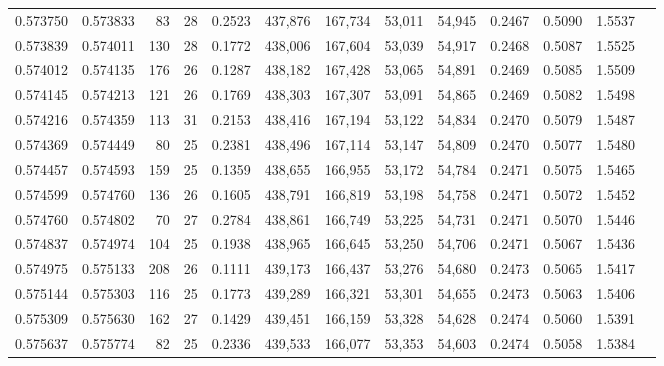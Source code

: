\begin{tabular}{rrrrrrrrrrrrr}
0.573750 & 0.573833 &    83 &  28 &                                     0.2523 & 437,876 & 167,734 &  53,011 &  54,945 & 0.2467 & 0.5090 & 1.5537 \\
0.573839 & 0.574011 &   130 &  28 &                                     0.1772 & 438,006 & 167,604 &  53,039 &  54,917 & 0.2468 & 0.5087 & 1.5525 \\
0.574012 & 0.574135 &   176 &  26 &                                     0.1287 & 438,182 & 167,428 &  53,065 &  54,891 & 0.2469 & 0.5085 & 1.5509 \\
0.574145 & 0.574213 &   121 &  26 &                                     0.1769 & 438,303 & 167,307 &  53,091 &  54,865 & 0.2469 & 0.5082 & 1.5498 \\
0.574216 & 0.574359 &   113 &  31 &                                     0.2153 & 438,416 & 167,194 &  53,122 &  54,834 & 0.2470 & 0.5079 & 1.5487 \\
0.574369 & 0.574449 &    80 &  25 &                                     0.2381 & 438,496 & 167,114 &  53,147 &  54,809 & 0.2470 & 0.5077 & 1.5480 \\
0.574457 & 0.574593 &   159 &  25 &                                     0.1359 & 438,655 & 166,955 &  53,172 &  54,784 & 0.2471 & 0.5075 & 1.5465 \\
0.574599 & 0.574760 &   136 &  26 &                                     0.1605 & 438,791 & 166,819 &  53,198 &  54,758 & 0.2471 & 0.5072 & 1.5452 \\
0.574760 & 0.574802 &    70 &  27 &                                     0.2784 & 438,861 & 166,749 &  53,225 &  54,731 & 0.2471 & 0.5070 & 1.5446 \\
0.574837 & 0.574974 &   104 &  25 &                                     0.1938 & 438,965 & 166,645 &  53,250 &  54,706 & 0.2471 & 0.5067 & 1.5436 \\
0.574975 & 0.575133 &   208 &  26 &                                     0.1111 & 439,173 & 166,437 &  53,276 &  54,680 & 0.2473 & 0.5065 & 1.5417 \\
0.575144 & 0.575303 &   116 &  25 &                                     0.1773 & 439,289 & 166,321 &  53,301 &  54,655 & 0.2473 & 0.5063 & 1.5406 \\
0.575309 & 0.575630 &   162 &  27 &                                     0.1429 & 439,451 & 166,159 &  53,328 &  54,628 & 0.2474 & 0.5060 & 1.5391 \\
0.575637 & 0.575774 &    82 &  25 &                                     0.2336 & 439,533 & 166,077 &  53,353 &  54,603 & 0.2474 & 0.5058 & 1.5384 \\

\end{tabular}
